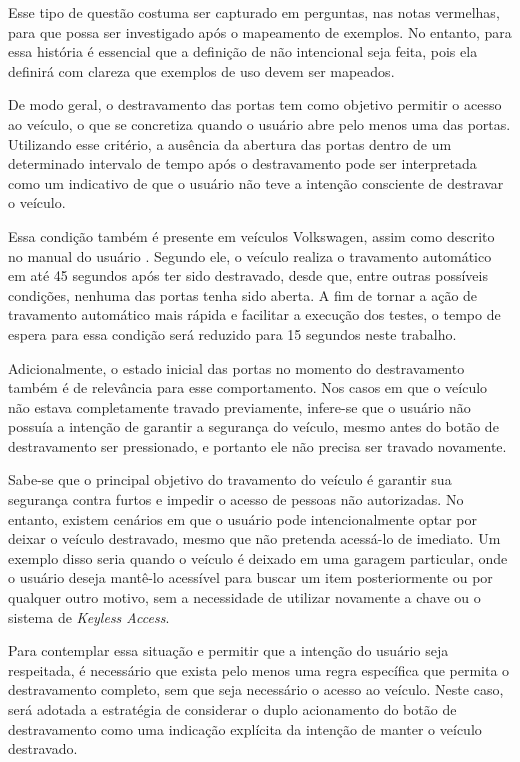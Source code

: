Esse tipo de questão costuma ser capturado em perguntas, nas notas vermelhas, para que possa ser investigado após o mapeamento de exemplos. No entanto, para essa 
história é essencial que a definição de não intencional seja feita, pois ela definirá com clareza que exemplos de uso devem ser mapeados.

De modo geral, o destravamento das portas tem como objetivo permitir o acesso ao veículo, o que se concretiza quando o usuário abre pelo menos uma das portas. Utilizando 
esse critério, a ausência da abertura das portas dentro de um determinado intervalo de tempo após o destravamento pode ser interpretada como um indicativo de que o 
usuário não teve a intenção consciente de destravar o veículo. 

Essa condição também é presente em veículos Volkswagen, assim como descrito no manual do usuário \cite{vwLocking}. Segundo ele, o veículo realiza o travamento automático 
em até 45 segundos após ter sido destravado, desde que, entre outras possíveis condições, nenhuma das portas tenha sido aberta. A fim de tornar a ação de travamento 
automático mais rápida e facilitar a execução dos testes, o tempo de espera para essa condição será reduzido para 15 segundos neste trabalho.

Adicionalmente, o estado inicial das portas no momento do destravamento também é de relevância para esse comportamento. Nos casos em que o veículo não estava 
completamente travado previamente, infere-se que o usuário não possuía a intenção de garantir a segurança do veículo, mesmo antes do botão de destravamento ser 
pressionado, e portanto ele não precisa ser travado novamente.

Sabe-se que o principal objetivo do travamento do veículo é garantir sua segurança contra furtos e impedir o acesso de pessoas não autorizadas. No entanto, existem 
cenários em que o usuário pode intencionalmente optar por deixar o veículo destravado, mesmo que não pretenda acessá-lo de imediato. Um exemplo disso seria quando 
o veículo é deixado em uma garagem particular, onde o usuário deseja mantê-lo acessível para buscar um item posteriormente ou por qualquer outro motivo, sem a 
necessidade de utilizar novamente a chave ou o sistema de \textit{Keyless Access}.

Para contemplar essa situação e permitir que a intenção do usuário seja respeitada, é necessário que exista pelo menos uma regra específica que permita o 
destravamento completo, sem que seja necessário o acesso ao veículo. Neste caso, será adotada a estratégia de considerar o duplo acionamento do botão de 
destravamento como uma indicação explícita da intenção de manter o veículo destravado.

